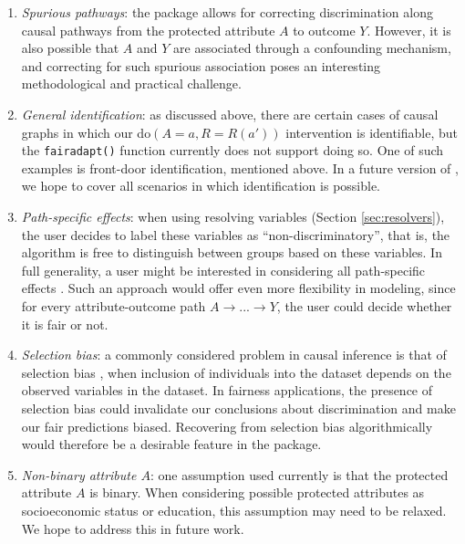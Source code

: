 \documentclass[
  nojss]{jss}
\begin{document}
\begin{enumerate}
\def\labelenumi{\arabic{enumi}.}
\item
  \emph{Spurious pathways}: the  package allows for
  correcting discrimination along causal pathways from the protected
  attribute \(A\) to outcome \(Y\). However, it is also possible that
  \(A\) and \(Y\) are associated through a confounding mechanism, and
  correcting for such spurious association poses an interesting
  methodological and practical challenge.
\item
  \emph{General identification}: as discussed above, there are certain
  cases of causal graphs in which our do\((A = a, R = R(a'))\)
  intervention is identifiable, but the \texttt{fairadapt()} function
  currently does not support doing so. One of such examples is
  front-door identification, mentioned above. In a future version of
  , we hope to cover all scenarios in which
  identification is possible.
\item
  \emph{Path-specific effects}: when using resolving variables (Section
  \ref{sec:resolvers}), the user decides to label these variables as
  ``non-discriminatory'', that is, the algorithm is free to distinguish
  between groups based on these variables. In full generality, a user
  might be interested in considering all path-specific effects
  \citep{avin2005identifiability}. Such an approach would offer even
  more flexibility in modeling, since for every attribute-outcome path
  \(A \rightarrow ... \rightarrow Y\), the user could decide whether it
  is fair or not.
\item
  \emph{Selection bias}: a commonly considered problem in causal
  inference is that of selection bias \citep{hernan2004structural}, when
  inclusion of individuals into the dataset depends on the observed
  variables in the dataset. In fairness applications, the presence of
  selection bias could invalidate our conclusions about discrimination
  and make our fair predictions biased. Recovering from selection bias
  algorithmically would therefore be a desirable feature in the
   package.
\item
  \emph{Non-binary attribute \(A\)}: one assumption used currently is
  that the protected attribute \(A\) is binary. When considering
  possible protected attributes as socioeconomic status or education,
  this assumption may need to be relaxed. We hope to address this in
  future work.
\end{enumerate}


\end{document}
